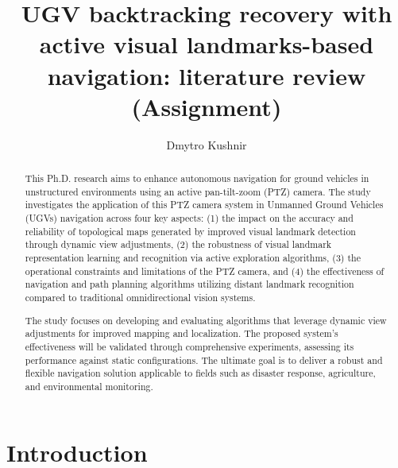 \documentclass[runningheads]{llncs}
\begin{document}
%
\title{
UGV backtracking recovery with active visual landmarks-based navigation: literature review (Assignment)
}
%
%

\author{Dmytro Kushnir }
%
%
%
\maketitle              %
%
\begin{abstract}
This Ph.D. research aims to enhance autonomous navigation for ground vehicles in unstructured environments using an active pan-tilt-zoom (PTZ) camera. The study investigates the application of this PTZ camera system in Unmanned Ground Vehicles (UGVs) navigation across four key aspects: (1) the impact on the accuracy and reliability of topological maps generated by improved visual landmark detection through dynamic view adjustments, (2) the robustness of visual landmark representation learning and recognition via active exploration algorithms, (3) the operational constraints and limitations of the PTZ camera, and (4) the effectiveness of navigation and path planning algorithms utilizing distant landmark recognition compared to traditional omnidirectional vision systems.

The study focuses on developing and evaluating algorithms that leverage dynamic view adjustments for improved mapping and localization. The proposed system's effectiveness will be validated through comprehensive experiments, assessing its performance against static configurations. The ultimate goal is to deliver a robust and flexible navigation solution applicable to fields such as disaster response, agriculture, and environmental monitoring.


\end{abstract}


\section{Introduction}
\end{document}

